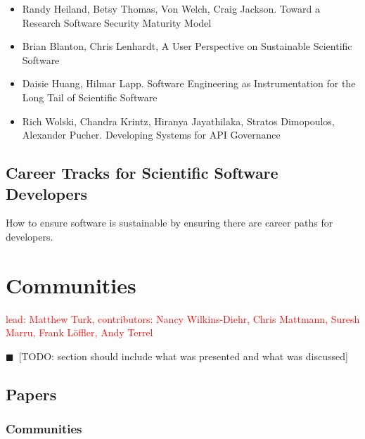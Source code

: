 \documentclass[11pt, oneside]{amsart}
\newcommand{\todo}[1]{{\color{blue}$\blacksquare$~\textsf{[TODO: #1]}}}
\newcommand{\note}[1]{ {\textcolor{red}    { #1 }}}
\begin{document}
\begin{itemize}

\item Randy Heiland, Betsy Thomas, Von Welch, Craig Jackson. Toward a
  Research Software Security Maturity Model \cite{Heiland_WSSSPE}

\item Brian Blanton, Chris Lenhardt, A User Perspective on Sustainable
  Scientific Software \cite{Blanton_WSSSPE}

\item Daisie Huang, Hilmar Lapp. Software Engineering as
  Instrumentation for the Long Tail of Scientific Software
  \cite{Huang_WSSSPE}

\item Rich Wolski, Chandra Krintz, Hiranya Jayathilaka, Stratos
  Dimopoulos, Alexander Pucher. Developing Systems for API Governance
  \cite{Wolski_WSSSPE}

\end{itemize}


\subsection{Career Tracks for Scientific Software Developers}

How to ensure software is sustainable by ensuring there are career
paths for developers.

\section{Communities} \label{sec:community}

\note{lead: Matthew Turk, contributors: Nancy Wilkins-Diehr, Chris Mattmann, Suresh Marru, Frank L\"{o}ffler, Andy Terrel}

\todo{section should include what was presented and what was discussed}

\subsection{Papers}

\subsubsection*{Communities}
\end{document}

